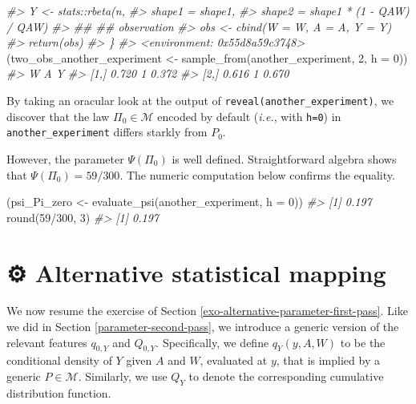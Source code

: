 \documentclass[
  11pt,
  openright,twoside]{book}
\newenvironment{Shaded}{\begin{snugshade}}{\end{snugshade}}
\newcommand{\AttributeTok}[1]{\textcolor[rgb]{0.77,0.63,0.00}{#1}}
\newcommand{\CommentTok}[1]{\textcolor[rgb]{0.56,0.35,0.01}{\textit{#1}}}
\newcommand{\DecValTok}[1]{\textcolor[rgb]{0.00,0.00,0.81}{#1}}
\newcommand{\FunctionTok}[1]{\textcolor[rgb]{0.00,0.00,0.00}{#1}}
\newcommand{\NormalTok}[1]{#1}
\newcommand{\OtherTok}[1]{\textcolor[rgb]{0.56,0.35,0.01}{#1}}
\newcommand{\SpecialCharTok}[1]{\textcolor[rgb]{0.00,0.00,0.00}{#1}}
\newcommand{\gear}{\usebox{\gearbox}\;}
\newcommand{\calM}{\mathcal{M}}
\theoremstyle{definition}
\theoremstyle{definition}
\theoremstyle{definition}
\theoremstyle{definition}
\theoremstyle{remark}
\begin{document}
\begin{Shaded}
\begin{Highlighting}[]
\CommentTok{\#\textgreater{}         Y \textless{}{-} stats::rbeta(n,}
\CommentTok{\#\textgreater{}                           shape1 = shape1,}
\CommentTok{\#\textgreater{}                           shape2 = shape1 * (1 {-} QAW) / QAW)}
\CommentTok{\#\textgreater{}         \#\# \#\# observation}
\CommentTok{\#\textgreater{}         obs \textless{}{-} cbind(W = W, A = A, Y = Y)}
\CommentTok{\#\textgreater{}         return(obs)}
\CommentTok{\#\textgreater{}       \}}
\CommentTok{\#\textgreater{} \textless{}environment: 0x55d8a59c3748\textgreater{}}
\NormalTok{(two\_obs\_another\_experiment }\OtherTok{\textless{}{-}} \FunctionTok{sample\_from}\NormalTok{(another\_experiment, }\DecValTok{2}\NormalTok{, }\AttributeTok{h =} \DecValTok{0}\NormalTok{))}
\CommentTok{\#\textgreater{}          W A     Y}
\CommentTok{\#\textgreater{} [1,] 0.720 1 0.372}
\CommentTok{\#\textgreater{} [2,] 0.616 1 0.670}
\end{Highlighting}
\end{Shaded}

By taking an oracular look at the output of \texttt{reveal(another\_experiment)}, we
discover that the law \(\Pi_{0} \in \calM\) encoded by default (\emph{i.e.}, with
\texttt{h=0}) in \texttt{another\_experiment} differs starkly from \(P_{0}\).

However, the parameter \(\Psi(\Pi_{0})\) is well defined. Straightforward
algebra shows that \(\Psi(\Pi_{0}) = 59/300\). The numeric computation below
confirms the equality.

\begin{Shaded}
\begin{Highlighting}[]
\NormalTok{(psi\_Pi\_zero }\OtherTok{\textless{}{-}} \FunctionTok{evaluate\_psi}\NormalTok{(another\_experiment, }\AttributeTok{h =} \DecValTok{0}\NormalTok{))}
\CommentTok{\#\textgreater{} [1] 0.197}
\FunctionTok{round}\NormalTok{(}\DecValTok{59}\SpecialCharTok{/}\DecValTok{300}\NormalTok{, }\DecValTok{3}\NormalTok{)}
\CommentTok{\#\textgreater{} [1] 0.197}
\end{Highlighting}
\end{Shaded}

\hypertarget{exo-alternative-parameter-second-pass}{%
\section{\texorpdfstring{⚙ \gear Alternative statistical mapping}{⚙ Alternative statistical mapping}}\label{exo-alternative-parameter-second-pass}}

We now resume the exercise of Section
\ref{exo-alternative-parameter-first-pass}. Like we did in Section
\ref{parameter-second-pass}, we introduce a generic version of the relevant
features \(q_{0,Y}\) and \(Q_{0,Y}\). Specifically, we define \(q_{Y}(y,A,W)\) to
be the conditional density of \(Y\) given \(A\) and \(W\), evaluated at \(y\), that is
implied by a generic \(P \in \calM\). Similarly, we use \(Q_{Y}\) to denote the
corresponding cumulative distribution function.
\end{document}
